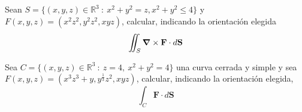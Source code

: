 \begin{tarea} Sean  $S=\{  (x,y,z) \in \mathbb{R}^{3} \: : \:  x ^{2}+ y^{2} = z,  x ^{2}+ y^{2}  \leq 4 \}$  y $F(x,y,z) = (x ^{2}z^{2}, y^{2}z^{2}, xyz)$, calcular, indicando la orientaci\'on elegida   $$\iint_S\grad\times\mathbf{F}\cdot d\mathbf{S}$$
\end{tarea}

\begin{tarea} Sea  $C=\{  (x,y,z) \in \mathbb{R}^{3} \: : \:  z=4, \: x ^{2}+ y^{2}   = 4 \}$  una curva cerrada y simple y sea  $F(x,y,z) = (x ^{3}z^{3}+y, y^{\frac{1}{3}}z^{2}, xyz)$,  calcular,  indicando la orientaci\'on elegida,      $$\int_{C}\mathbf{F}\cdot d\mathbf{S}$$
\end{tarea}